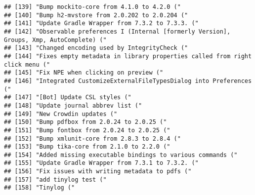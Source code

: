 \documentclass[
]{article}
\begin{document}
\begin{verbatim}
## [139] "Bump mockito-core from 4.1.0 to 4.2.0 ("                                                                                    
## [140] "Bump h2-mvstore from 2.0.202 to 2.0.204 ("                                                                                  
## [141] "Update Gradle Wrapper from 7.3.2 to 7.3.3. ("                                                                               
## [142] "Observable preferences I (Internal [formerly Version], Groups, Xmp, AutoComplete) ("                                        
## [143] "Changed encoding used by IntegrityCheck ("                                                                                  
## [144] "Fixes empty metadata in library properties called from right click menu ("                                                  
## [145] "Fix NPE when clicking on preview ("                                                                                         
## [146] "Integrated CustomizeExternalFileTypesDialog into Preferences ("                                                             
## [147] "[Bot] Update CSL styles ("                                                                                                  
## [148] "Update journal abbrev list ("                                                                                               
## [149] "New Crowdin updates ("                                                                                                      
## [150] "Bump pdfbox from 2.0.24 to 2.0.25 ("                                                                                        
## [151] "Bump fontbox from 2.0.24 to 2.0.25 ("                                                                                       
## [152] "Bump xmlunit-core from 2.8.3 to 2.8.4 ("                                                                                    
## [153] "Bump tika-core from 2.1.0 to 2.2.0 ("                                                                                       
## [154] "Added missing executable bindings to various commands ("                                                                    
## [155] "Update Gradle Wrapper from 7.3.1 to 7.3.2. ("                                                                               
## [156] "Fix issues with writing metadata to pdfs ("                                                                                 
## [157] "add tinylog test ("                                                                                                         
## [158] "Tinylog ("                                                                                                                  

\end{verbatim}
\end{document}
